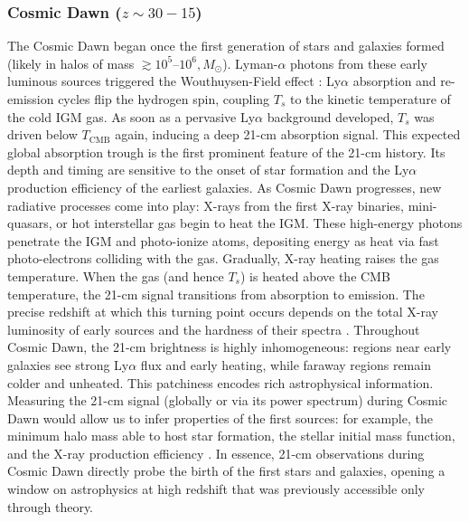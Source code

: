 \documentclass[floats,floatfix,showpacs,amssymb,prd,superscriptaddress,nofootinbib]{revtex4-2} %
\begin{document}
\subsubsection{Cosmic Dawn ($z \sim 30-15$)}
The Cosmic Dawn began once the first generation of stars and galaxies formed (likely in halos of mass $\gtrsim10^5$–$10^6,M_\odot$). Lyman-$\alpha$ photons from these early luminous sources triggered the Wouthuysen-Field effect \citep{Wouthuysen_1952, Field_1958}: Ly$\alpha$ absorption and re-emission cycles flip the hydrogen spin, coupling $T_s$ to the kinetic temperature of the cold IGM gas. As soon as a pervasive Ly$\alpha$ background developed, $T_s$ was driven below $T_{\text{CMB}}$ again, inducing a deep 21-cm absorption signal. This expected global absorption trough is the first prominent feature of the 21-cm history. %
Its depth and timing are sensitive to the onset of star formation and the Ly$\alpha$ production efficiency of the earliest galaxies. As Cosmic Dawn progresses, new radiative processes come into play: X-rays from the first X-ray binaries, mini-quasars, or hot interstellar gas begin to heat the IGM. These high-energy photons penetrate the IGM and photo-ionize atoms, depositing energy as heat via fast photo-electrons colliding with the gas. Gradually, X-ray heating raises the gas temperature. When the gas (and hence $T_s$) is heated above the CMB temperature, the 21-cm signal transitions from absorption to emission. The precise redshift at which this turning point occurs depends on the total X-ray luminosity of early sources and the hardness of their spectra \citep{Fialkov_2014b, Mirocha_2017}. Throughout Cosmic Dawn, the 21-cm brightness is highly inhomogeneous: regions near early galaxies see strong Ly$\alpha$ flux and early heating, while faraway regions remain colder and unheated. This patchiness encodes rich astrophysical information. Measuring the 21-cm signal (globally or via its power spectrum) during Cosmic Dawn would allow us to infer properties of the first sources: for example, the minimum halo mass able to host star formation, the stellar initial mass function, and the X-ray production efficiency \citep{Pober_2014}.
In essence, 21-cm observations during Cosmic Dawn directly probe the birth of the first stars and galaxies, opening a window on astrophysics at high redshift that was previously accessible only through theory.
\end{document}
